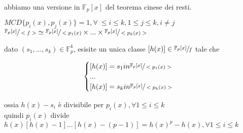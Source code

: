 \documentclass[a4paper,12pt]{article}
\theoremstyle{def}
\theoremstyle{prop}
\theoremstyle{esempio}
\theoremstyle{dimostrazione}
\theoremstyle{teo}
\theoremstyle{osservazione}
\begin{document}
abbiamo una versione in \(\mathbb{F}_p[x]\) del teorema cinese dei resti.\\
\begin{center}
    \( MCD\{ p_i(x), p_j(x)\} = 1, \forall \ \leq i \leq k, 1 \leq j \leq k, i \neq j\)\\
    \(\sfrac{\mathbb{F}_p[x]}{<f>} \simeq \sfrac{\mathbb{F}_p[x]}{<p_1(x)} \times ... \times \sfrac{\mathbb{F}_p[x]}{<p_k(x)>}\)
\end{center}
dato \((s_1, ..., s_k) \in \mathbb{F}_p^k\), esisite un unica classe \([h(x)] \in \sfrac{\mathbb{F}_p[x]}{f}\) tale che
\begin{center}
    \[
    \begin{cases}
        [h(x)] = s_1 in  \sfrac{\mathbb{F}_p[x]}{<p_1(x)>}\\
        ...\\
        [h(x)] = s_k in \sfrac{\mathbb{F}_p[x]}{<p_k(x)>}
    \end{cases}
    \]
\end{center}
ossia \(h(x) - s_i\) è divisibile per \(p_i(x), \forall 1 \leq i \leq k\)\\
quindi \(p_i(x)\) divide \(h(x)[h(x) - 1] ... [h(x) - (p - 1)] = h(x)^p - h(x), \forall 1 \leq i \leq k\)\\

\newpage
\end{document}

